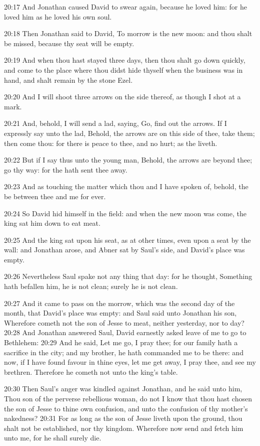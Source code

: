 20:17 And Jonathan caused David to swear again, because he loved him: for he loved him as he loved his own soul.

20:18 Then Jonathan said to David, To morrow is the new moon: and thou shalt be missed, because thy seat will be empty.

20:19 And when thou hast stayed three days, then thou shalt go down quickly, and come to the place where thou didst hide thyself when the business was in hand, and shalt remain by the stone Ezel.

20:20 And I will shoot three arrows on the side thereof, as though I shot at a mark.

20:21 And, behold, I will send a lad, saying, Go, find out the arrows.  If I expressly say unto the lad, Behold, the arrows are on this side of thee, take them; then come thou: for there is peace to thee, and no hurt; as the \LORD liveth.

20:22 But if I say thus unto the young man, Behold, the arrows are beyond thee; go thy way: for the \LORD hath sent thee away.

20:23 And as touching the matter which thou and I have spoken of, behold, the \LORD be between thee and me for ever.

20:24 So David hid himself in the field: and when the new moon was come, the king sat him down to eat meat.

20:25 And the king sat upon his seat, as at other times, even upon a seat by the wall: and Jonathan arose, and Abner sat by Saul's side, and David's place was empty.

20:26 Nevertheless Saul spake not any thing that day: for he thought, Something hath befallen him, he is not clean; surely he is not clean.

20:27 And it came to pass on the morrow, which was the second day of the month, that David's place was empty: and Saul said unto Jonathan his son, Wherefore cometh not the son of Jesse to meat, neither yesterday, nor to day?  20:28 And Jonathan answered Saul, David earnestly asked leave of me to go to Bethlehem: 20:29 And he said, Let me go, I pray thee; for our family hath a sacrifice in the city; and my brother, he hath commanded me to be there: and now, if I have found favour in thine eyes, let me get away, I pray thee, and see my brethren. Therefore he cometh not unto the king's table.

20:30 Then Saul's anger was kindled against Jonathan, and he said unto him, Thou son of the perverse rebellious woman, do not I know that thou hast chosen the son of Jesse to thine own confusion, and unto the confusion of thy mother's nakedness?  20:31 For as long as the son of Jesse liveth upon the ground, thou shalt not be established, nor thy kingdom. Wherefore now send and fetch him unto me, for he shall surely die.

